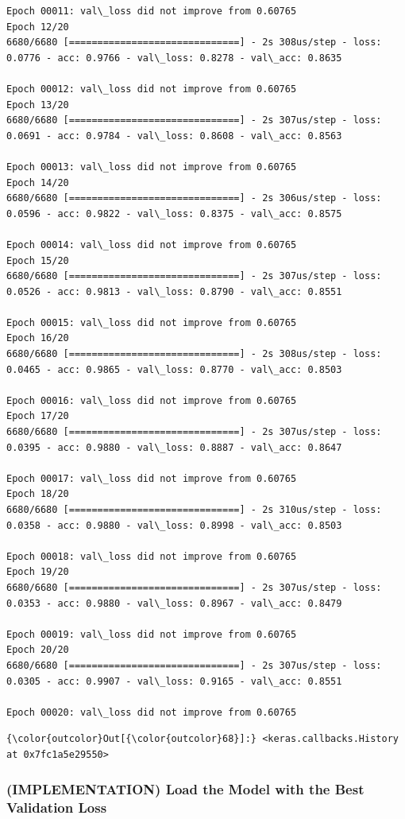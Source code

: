 \documentclass[11pt]{article}
\begin{document}
\begin{Verbatim}[commandchars=\\\{\}]
Epoch 00011: val\_loss did not improve from 0.60765
Epoch 12/20
6680/6680 [==============================] - 2s 308us/step - loss: 0.0776 - acc: 0.9766 - val\_loss: 0.8278 - val\_acc: 0.8635

Epoch 00012: val\_loss did not improve from 0.60765
Epoch 13/20
6680/6680 [==============================] - 2s 307us/step - loss: 0.0691 - acc: 0.9784 - val\_loss: 0.8608 - val\_acc: 0.8563

Epoch 00013: val\_loss did not improve from 0.60765
Epoch 14/20
6680/6680 [==============================] - 2s 306us/step - loss: 0.0596 - acc: 0.9822 - val\_loss: 0.8375 - val\_acc: 0.8575

Epoch 00014: val\_loss did not improve from 0.60765
Epoch 15/20
6680/6680 [==============================] - 2s 307us/step - loss: 0.0526 - acc: 0.9813 - val\_loss: 0.8790 - val\_acc: 0.8551

Epoch 00015: val\_loss did not improve from 0.60765
Epoch 16/20
6680/6680 [==============================] - 2s 308us/step - loss: 0.0465 - acc: 0.9865 - val\_loss: 0.8770 - val\_acc: 0.8503

Epoch 00016: val\_loss did not improve from 0.60765
Epoch 17/20
6680/6680 [==============================] - 2s 307us/step - loss: 0.0395 - acc: 0.9880 - val\_loss: 0.8887 - val\_acc: 0.8647

Epoch 00017: val\_loss did not improve from 0.60765
Epoch 18/20
6680/6680 [==============================] - 2s 310us/step - loss: 0.0358 - acc: 0.9880 - val\_loss: 0.8998 - val\_acc: 0.8503

Epoch 00018: val\_loss did not improve from 0.60765
Epoch 19/20
6680/6680 [==============================] - 2s 307us/step - loss: 0.0353 - acc: 0.9880 - val\_loss: 0.8967 - val\_acc: 0.8479

Epoch 00019: val\_loss did not improve from 0.60765
Epoch 20/20
6680/6680 [==============================] - 2s 307us/step - loss: 0.0305 - acc: 0.9907 - val\_loss: 0.9165 - val\_acc: 0.8551

Epoch 00020: val\_loss did not improve from 0.60765

    \end{Verbatim}

\begin{Verbatim}[commandchars=\\\{\}]
{\color{outcolor}Out[{\color{outcolor}68}]:} <keras.callbacks.History at 0x7fc1a5e29550>
\end{Verbatim}
            
    \subsubsection{(IMPLEMENTATION) Load the Model with the Best Validation
Loss}\label{implementation-load-the-model-with-the-best-validation-loss}
\end{document}
